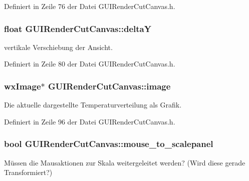 Definiert in Zeile 76 der Datei G\-U\-I\-Render\-Cut\-Canvas.\-h.

\hypertarget{classGUIRenderCutCanvas_a17b630c38009368a99e37b9f0eab3deb}{
\subsubsection[{delta\-Y}]{\setlength{\rightskip}{0pt plus 5cm}float G\-U\-I\-Render\-Cut\-Canvas\-::delta\-Y\hspace{0.3cm}{\ttfamily [private]}}}\label{classGUIRenderCutCanvas_a17b630c38009368a99e37b9f0eab3deb}
vertikale Verschiebung der Ansicht. 

Definiert in Zeile 80 der Datei G\-U\-I\-Render\-Cut\-Canvas.\-h.

\hypertarget{classGUIRenderCutCanvas_a11ac45e65920dedf0cfbba21865dc2f9}{
\subsubsection[{image}]{\setlength{\rightskip}{0pt plus 5cm}wx\-Image$\ast$ G\-U\-I\-Render\-Cut\-Canvas\-::image\hspace{0.3cm}{\ttfamily [private]}}}\label{classGUIRenderCutCanvas_a11ac45e65920dedf0cfbba21865dc2f9}
Die aktuelle dargestellte Temperaturverteilung als Grafik. 

Definiert in Zeile 96 der Datei G\-U\-I\-Render\-Cut\-Canvas.\-h.

\hypertarget{classGUIRenderCutCanvas_a67247191a5442c586d32c9ef6cb1df2e}{
\subsubsection[{mouse\-\_\-to\-\_\-scalepanel}]{\setlength{\rightskip}{0pt plus 5cm}bool G\-U\-I\-Render\-Cut\-Canvas\-::mouse\-\_\-to\-\_\-scalepanel\hspace{0.3cm}{\ttfamily [private]}}}\label{classGUIRenderCutCanvas_a67247191a5442c586d32c9ef6cb1df2e}
Müssen die Mausaktionen zur Skala weitergeleitet werden? (Wird diese gerade Transformiert?) 


